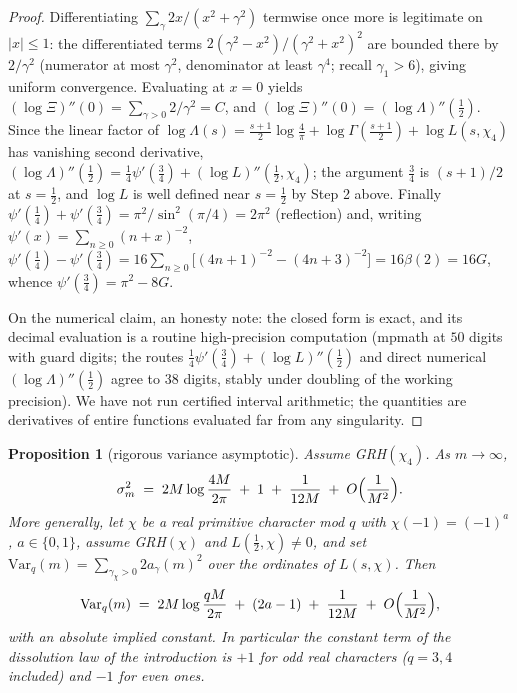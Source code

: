 \documentclass[11pt]{article}
\newtheorem{proposition}{Proposition}
\begin{document}
\begin{proof}
Differentiating $\sum_\gamma 2x/(x^2+\gamma^2)$ termwise once more is
legitimate on $|x|\le1$: the differentiated terms
$2(\gamma^2-x^2)/(\gamma^2+x^2)^2$ are bounded there by $2/\gamma^2$
(numerator at most $\gamma^2$, denominator at least $\gamma^4$; recall
$\gamma_1>6$), giving uniform convergence. Evaluating at $x=0$ yields
$(\log\Xi)''(0)=\sum_{\gamma>0}2/\gamma^2=C$, and
$(\log\Xi)''(0)=(\log\Lambda)''(\tfrac12)$. Since the linear factor of
$\log\Lambda(s)=\tfrac{s+1}2\log\tfrac4\pi+\log\Gamma(\tfrac{s+1}2)
+\log L(s,\chi_4)$ has vanishing second derivative,
$(\log\Lambda)''(\tfrac12)=\tfrac14\psi'(\tfrac34)
+(\log L)''(\tfrac12,\chi_4)$; the argument $\tfrac34$ is
$(s+1)/2$ at $s=\tfrac12$, and $\log L$ is well defined near
$s=\tfrac12$ by Step 2 above. Finally
$\psi'(\tfrac14)+\psi'(\tfrac34)=\pi^2/\sin^2(\pi/4)=2\pi^2$
(reflection) and, writing $\psi'(x)=\sum_{n\ge0}(n+x)^{-2}$,
$\psi'(\tfrac14)-\psi'(\tfrac34)
=16\sum_{n\ge0}\bigl[(4n+1)^{-2}-(4n+3)^{-2}\bigr]=16\beta(2)=16G$,
whence $\psi'(\tfrac34)=\pi^2-8G$.

On the numerical claim, an honesty note: the closed form is exact, and
its decimal evaluation is a routine high-precision computation (mpmath
at $50$ digits with guard digits; the routes
$\tfrac14\psi'(\tfrac34)+(\log L)''(\tfrac12)$ and direct numerical
$(\log\Lambda)''(\tfrac12)$ agree to $38$ digits, stably under
doubling of the working precision). We have not run certified interval
arithmetic; the quantities are derivatives of entire functions
evaluated far from any singularity.
\end{proof}

\begin{proposition}[rigorous variance asymptotic]\label{prop:varasymp}
Assume GRH$(\chi_4)$. As $m\to\infty$,
\begin{equation}\label{eq:varasymp4}
\sigma_m^2\;=\;2M\log\frac{4M}{2\pi}\;+\;1\;+\;\frac{1}{12M}
\;+\;O\Bigl(\frac{1}{M^2}\Bigr).
\end{equation}
More generally, let $\chi$ be a real primitive character mod $q$ with
$\chi(-1)=(-1)^a$, $a\in\{0,1\}$, assume GRH$(\chi)$ and
$L(\tfrac12,\chi)\ne0$, and set
$\mathrm{Var}_q(m)=\sum_{\gamma_\chi>0}2a_{\gamma}(m)^2$ over the
ordinates of $L(s,\chi)$. Then
\begin{equation}\label{eq:varasympq}
\mathrm{Var}_q(m)\;=\;2M\log\frac{qM}{2\pi}\;+\;(2a-1)
\;+\;\frac{1}{12M}\;+\;O\Bigl(\frac{1}{M^2}\Bigr),
\end{equation}
with an absolute implied constant. In particular the constant term of
the dissolution law of the introduction is $+1$ for odd real
characters ($q=3,4$ included) and $-1$ for even ones.
\end{proposition}
\end{document}
